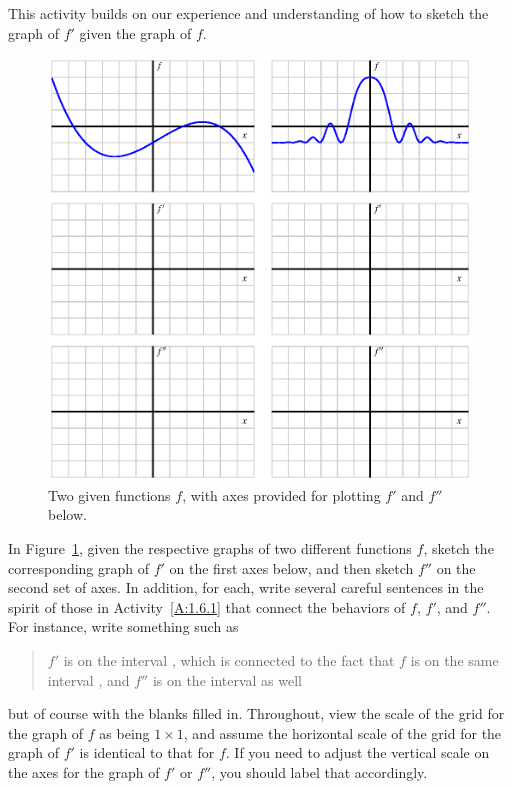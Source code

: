 \begin{activity} \label{A:1.6.2}
This activity builds on our experience and understanding of how to sketch the graph of $f'$ given the graph of $f$.  

\begin{figure}[h]
\begin{center}
\includegraphics{figures/1_6_Act2.eps}
\caption{Two given functions $f$, with axes provided for plotting $f'$ and $f''$ below.} \label{F:1.6.A2}
\end{center}
\end{figure}

\noindent In Figure~\ref{F:1.6.A2}, given the respective graphs of two different functions $f$, sketch the corresponding graph of $f'$ on the first axes below, and then sketch $f''$ on the second set of axes.  In addition, for each, write several careful sentences in the spirit of those in Activity~\ref{A:1.6.1} that connect the behaviors of $f$, $f'$, and $f''$.  For instance, write something such as
\begin{quote}
$f'$ is \underline{\hspace{1.5in}} on the interval \underline{\hspace{0.5in}}, which is connected to the fact that $f$ is \underline{\hspace{1.5in}} on the same interval \underline{\hspace{0.5in}}, and $f''$ is \underline{\hspace{1.5in}} on the interval as well
\end{quote}
but of course with the blanks filled in.  Throughout, view the scale of the grid for the graph of $f$ as being $1 \times 1$, and assume the horizontal scale of the grid for the graph of $f'$ is identical to that for $f$.  If you need to adjust the vertical scale on the axes for the graph of $f'$ or $f''$, you should label that accordingly.

\end{activity}
